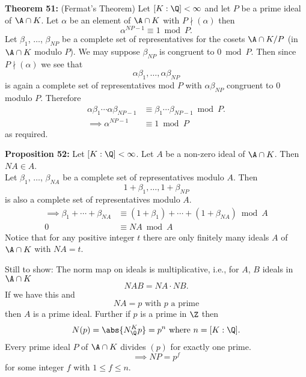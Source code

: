 \textbf{Theorem 51:} (Fermat's Theorem) Let $[K:\Q]<\infty$ and let $P$ be a prime ideal of $\A\cap K$.  Let $\alpha$ be an element of $\A\cap K$ with $P\nmid(\alpha)$ then
\[ \alpha^{NP-1} \equiv 1 \bmod P . \]
\pf Let $\beta_1$, $\dotsc$, $\beta_{NP}$ be a complete set of representatives for the cosets $\A\cap K/P$ (in $\A\cap K$ modulo $P$).  We may suppose $\beta_{NP}$ is congruent to $0\bmod P$.  Then since $P\nmid(\alpha)$ we see that
\[ \alpha\beta_1,\dotsc,\alpha\beta_{NP} \]
is again a complete set of representatives mod $P$ with $\alpha\beta_{NP}$ congruent to $0$ modulo $P$.  Therefore
\begin{align*}
\alpha\beta_1\dotsm\alpha\beta_{NP-1} &\equiv \beta_1\dotsm\beta_{NP-1} \bmod{P} . \\
\implies \alpha^{NP-1} &\equiv 1 \bmod{P}
\end{align*}
as required.

\textbf{Proposition 52:} Let $[K:\Q]<\infty$.  Let $A$ be a non-zero ideal of $\A\cap K$.  Then $NA\in A$. \\
\pf Let $\beta_1$, $\dotsc$, $\beta_{NA}$ be a complete set of representatives modulo $A$.  Then
\[ 1+\beta_1,\dotsc,1+\beta_{NP} \]
is also a complete set of representatives modulo $A$.
\begin{align*}
\implies \beta_1 + \dotsb + \beta_{NA} &\equiv (1+\beta_1) + \dotsb + (1+\beta_{NA}) \bmod{A} \\
0 &\equiv NA \bmod A
\end{align*}
Notice that for any positive integer $t$ there are only finitely many ideals $A$ of $\A\cap K$ with $NA=t$.

Still to show: The norm map on ideals is multiplicative, i.e., for $A$, $B$ ideals in $\A\cap K$
\[ NAB = NA\cdot NB . \]
If we have this and
\[ NA = p \text{ with $p$ a prime} \]
then $A$ is a prime ideal.  Further if $p$ is a prime in $\Z$ then 
\[ N(p) = \abs{N_\Q^K p} = p^n \text{ where $n=[K:\Q]$} . \]
Every prime ideal $P$ of $\A\cap K$ divides $(p)$ for exactly one prime.
\[ \implies NP = p^f \]
for some integer $f$ with $1\leq f\leq n$.